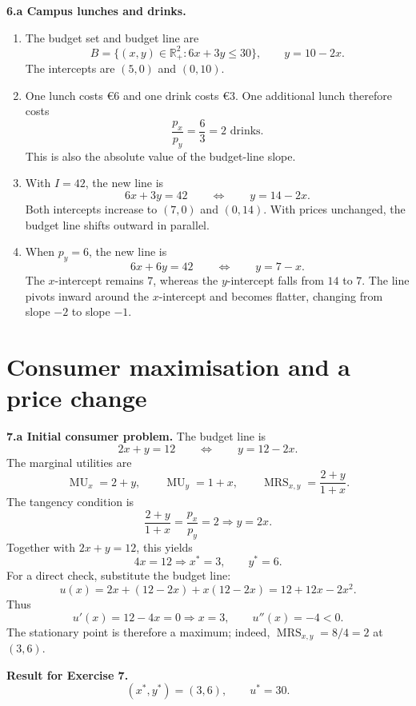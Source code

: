 \documentclass[11pt,a4paper]{article}
\newcommand{\MRS}{\operatorname{MRS}}
\newcommand{\MU}{\operatorname{MU}}
\begin{document}
\textbf{6.a Campus lunches and drinks.}

\begin{enumerate}[label=(\roman*)]
  \item The budget set and budget line are
  \[
    B=\{(x,y)\in\mathbb{R}_+^2:6x+3y\leq30\},
    \qquad
    y=10-2x.
  \]
  The intercepts are \(\boxed{(5,0)}\) and \(\boxed{(0,10)}\).

  \item One lunch costs \euro6 and one drink costs \euro3. One additional
  lunch therefore costs
  \[
    \frac{p_x}{p_y}=\frac63=\boxed{2\text{ drinks}}.
  \]
  This is also the absolute value of the budget-line slope.

  \item With \(I=42\), the new line is
  \[
    6x+3y=42
    \qquad\Longleftrightarrow\qquad
    y=14-2x.
  \]
  Both intercepts increase to \((7,0)\) and \((0,14)\). With prices
  unchanged, the budget line shifts outward in parallel.

  \item When \(p_y=6\), the new line is
  \[
    6x+6y=42
    \qquad\Longleftrightarrow\qquad
    y=7-x.
  \]
  The \(x\)-intercept remains \(7\), whereas the \(y\)-intercept falls from
  \(14\) to \(7\). The line pivots inward around the \(x\)-intercept and
  becomes flatter, changing from slope \(-2\) to slope \(-1\).
\end{enumerate}

\section{Consumer maximisation and a price change}

\textbf{7.a Initial consumer problem.} The budget line is
\[
  2x+y=12
  \qquad\Longleftrightarrow\qquad
  y=12-2x.
\]
The marginal utilities are
\[
  \MU_x=2+y,
  \qquad
  \MU_y=1+x,
  \qquad
  \MRS_{x,y}=\frac{2+y}{1+x}.
\]
The tangency condition is
\[
  \frac{2+y}{1+x}=\frac{p_x}{p_y}=2
  \Longrightarrow y=2x.
\]
Together with \(2x+y=12\), this yields
\[
  4x=12
  \Longrightarrow
  x^*=3,
  \qquad
  y^*=6.
\]
For a direct check, substitute the budget line:
\[
  u(x)=2x+(12-2x)+x(12-2x)=12+12x-2x^2.
\]
Thus
\[
  u'(x)=12-4x=0
  \Longrightarrow x=3,
  \qquad
  u''(x)=-4<0.
\]
The stationary point is therefore a maximum; indeed,
\(\MRS_{x,y}=8/4=2\) at \((3,6)\).

\begin{solutionbox}
\textbf{Result for Exercise 7.}
\[
  \boxed{(x^*,y^*)=(3,6),\qquad u^*=30.}
\]
\end{solutionbox}
\end{document}
